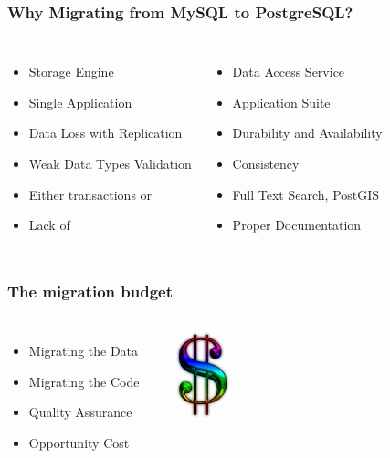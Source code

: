 \documentclass{beamer}
\begin{document}
\begin{frame}[fragile]
  \frametitle{Why Migrating from MySQL to PostgreSQL?}
  
\begin{columns}[c]

  \vfill

  \begin{itemize}
  \item Storage Engine
  \item Single Application
  \item Data Loss with Replication
  \item Weak Data Types Validation
  \item Either transactions or
  \item Lack of
  \end{itemize}


  \vfill

  \begin{itemize}
  \item Data Access Service
  \item Application Suite
  \item Durability and Availability
  \item Consistency
  \item Full Text Search, PostGIS
  \item Proper Documentation
  \end{itemize}
\end{columns}
\end{frame}

\begin{frame}[fragile]
  \frametitle{The migration budget}
  
  \vfill

\begin{columns}

  \begin{itemize}
  \item Migrating the Data
  \item Migrating the Code
  \item Quality Assurance
  \item Opportunity Cost
  \end{itemize}  

\begin{center}
  \includegraphics[height=7em]{Dollar-sign.jpg}
\end{center}
\end{columns}
\end{frame}
\end{document}
